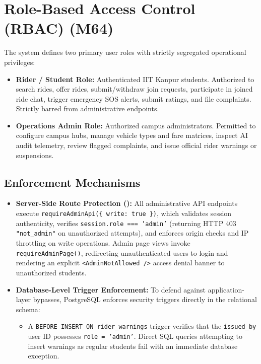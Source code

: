 \documentclass[10pt]{article}
\begin{document}
\section{Role-Based Access Control (RBAC) (M64)}
The system defines two primary user roles with strictly segregated operational privileges:
\begin{itemize}
  \item \textbf{Rider / Student Role:} Authenticated IIT Kanpur students. Authorized to search rides, offer rides, submit/withdraw join requests, participate in joined ride chat, trigger emergency SOS alerts, submit ratings, and file complaints. Strictly barred from administrative endpoints.
  \item \textbf{Operations Admin Role:} Authorized campus administrators. Permitted to configure campus hubs, manage vehicle types and fare matrices, inspect AI audit telemetry, review flagged complaints, and issue official rider warnings or suspensions.
\end{itemize}

\subsection{Enforcement Mechanisms}
\begin{itemize}
  \item \textbf{Server-Side Route Protection ():} All administrative API endpoints execute \texttt{requireAdminApi(\{ write: true \})}, which validates session authenticity, verifies \texttt{session.role === 'admin'} (returning HTTP 403 \texttt{"not\_admin"} on unauthorized attempts), and enforces origin checks and IP throttling on write operations. Admin page views invoke \texttt{requireAdminPage()}, redirecting unauthenticated users to login and rendering an explicit \texttt{<AdminNotAllowed />} access denial banner to unauthorized students.
  \item \textbf{Database-Level Trigger Enforcement:} To defend against application-layer bypasses, PostgreSQL enforces security triggers directly in the relational schema:
  \begin{itemize}
    \item A \texttt{BEFORE INSERT ON rider\_warnings} trigger verifies that the \texttt{issued\_by} user ID possesses \texttt{role = 'admin'}. Direct SQL queries attempting to insert warnings as regular students fail with an immediate database exception.
  \end{itemize}
\end{itemize}
\end{document}
